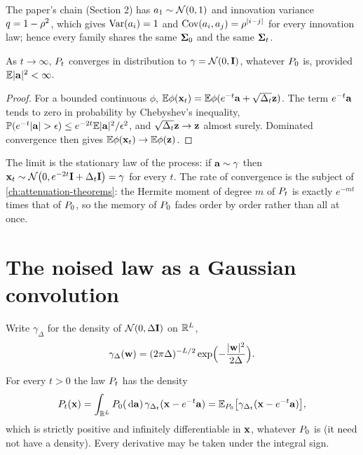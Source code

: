 The paper's chain (Section 2) has $a_1\sim\mathcal{N}\!\left(0,1\right)$ and innovation variance
$q=1-\rho^2$, which gives $\operatorname{Var}(a_i)=1$ and $\operatorname{Cov}(a_i,a_j)=\rho^{|i-j|}$ for
every innovation law; hence every family shares the same $\mathbf{\Sigma}_0$ and the same $\mathbf{\Sigma}_t$.

\begin{proposition}
\label{prop:ou:limit}
As $t\to\infty$, $P_t$ converges in distribution to $\gamma=\mathcal{N}\!\left(0,\mathbf{I}\right)$, whatever
$P_0$ is, provided $\mathbb{E}|\mathbf{a}|^2<\infty$.
\end{proposition}

\begin{proof}
For a bounded continuous $\phi$, $\mathbb{E}\phi(\mathbf{x}_t)=\mathbb{E}\phi(e^{-t}\mathbf{a}+\sqrt{\Delta_t}\mathbf{z})$. The
term $e^{-t}\mathbf{a}$ tends to zero in probability by Chebyshev's inequality,
$\Prob(e^{-t}|\va|>\epsilon)\le e^{-2t}\E|\va|^2/\epsilon^2$, and $\sqrt{\Delta_t}\mathbf{z}\to\mathbf{z}$
almost surely. Dominated convergence then gives $\mathbb{E}\phi(\mathbf{x}_t)\to\mathbb{E}\phi(\mathbf{z})$.
\end{proof}

The limit is the stationary law of the process: if $\mathbf{a}\sim\gamma$ then
$\mathbf{x}_t\sim\mathcal{N}\!\left(0,e^{-2t}\mathbf{I}+\Delta_t\mathbf{I}\right)=\gamma$ for every $t$. The rate of convergence is
the subject of \cref{ch:attenuation-theorems}: the Hermite moment of degree $m$ of
$P_t$ is exactly $e^{-mt}$ times that of $P_0$, so the memory of $P_0$ fades order by
order rather than all at once.

\section{The noised law as a Gaussian convolution}
\label{sec:ou:convolution}

Write $\gamma_{\Delta}$ for the density of $\mathcal{N}\!\left(0,\Delta\mathbf{I}\right)$ on $\mathbb{R}^{L}$,
\begin{equation}
  \gamma_{\Delta}(\mathbf{w})=(2\pi\Delta)^{-L/2}\exp\Bigl(-\frac{|\mathbf{w}|^2}{2\Delta}\Bigr).
  \label{eq:ou:gaussdensity}
\end{equation}

\begin{proposition}
\label{prop:ou:convolution}
For every $t>0$ the law $P_t$ has the density
\begin{equation}
  P_t(\mathbf{x})=\int_{\mathbb{R}^{L}}P_0(\,\mathrm{d}\mathbf{a})\,\gamma_{\Delta_t}(\mathbf{x}-e^{-t}\mathbf{a})
         =\mathbb{E}_{P_0}\bigl[\gamma_{\Delta_t}(\mathbf{x}-e^{-t}\mathbf{a})\bigr],
  \label{eq:ou:convolution}
\end{equation}
which is strictly positive and infinitely differentiable in $\mathbf{x}$, whatever $P_0$ is
(it need not have a density). Every derivative may be taken under the integral sign.
\end{proposition}

